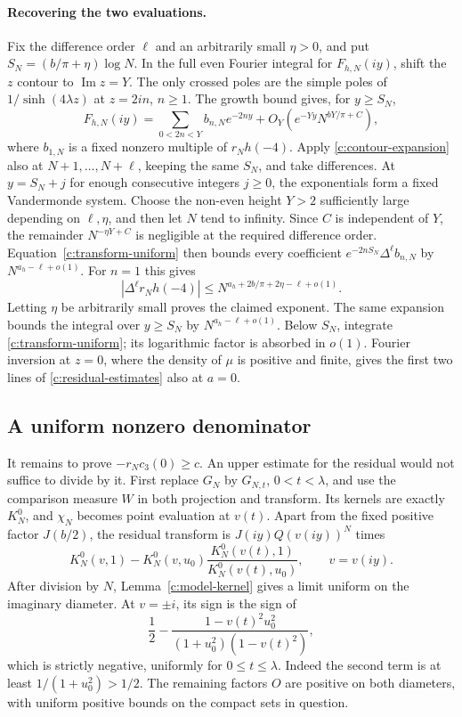 \documentclass[11pt]{article}
\numberwithin{equation}{section}
\theoremstyle{definition}\newtheorem{definition}[theorem]{Definition}
\theoremstyle{remark}\newtheorem{remark}[theorem]{Remark}
\begin{document}
\paragraph{Recovering the two evaluations.}
Fix the difference order $\ell$ and an arbitrarily small $\eta>0$, and
put $S_N=(b/\pi+\eta)\log N$.  In the full even Fourier integral for
$F_{h,N}(iy)$, shift the $z$ contour to $\operatorname{Im}z=Y$.
The only crossed poles are the simple poles of $1/\sinh(4\lambda z)$
at $z=2in$, $n\ge1$.  The growth bound gives, for $y\ge S_N$,
\begin{equation}\label{c:contour-expansion}
 F_{h,N}(iy)=\sum_{0<2n<Y}b_{n,N}e^{-2ny}
                  +O_Y(e^{-Yy}N^{bY/\pi+C}),
\end{equation}
where $b_{1,N}$ is a fixed nonzero multiple of $r_Nh(-4)$.
Apply \eqref{c:contour-expansion} also at $N+1,\ldots,N+\ell$,
keeping the same $S_N$, and take differences.  At
$y=S_N+j$ for enough consecutive integers $j\ge0$, the exponentials
form a fixed Vandermonde system.  Choose the non-even height $Y>2$
sufficiently large depending on $\ell,\eta$, and then let $N$ tend to
infinity.  Since $C$ is independent of $Y$, the remainder
$N^{-\eta Y+C}$ is negligible at the required difference order.
Equation~\eqref{c:transform-uniform} then bounds every coefficient
$e^{-2nS_N}\Delta^\ell b_{n,N}$ by
$N^{a_h-\ell+o(1)}$.  For $n=1$ this gives
\[
 |\Delta^\ell r_Nh(-4)|
 \le N^{a_h+2b/\pi+2\eta-\ell+o(1)}.
\]
Letting $\eta$ be arbitrarily small proves the claimed exponent.
The same expansion bounds the integral over $y\ge S_N$ by
$N^{a_h-\ell+o(1)}$.  Below $S_N$, integrate
\eqref{c:transform-uniform}; its logarithmic factor is absorbed in
$o(1)$.  Fourier inversion at $z=0$, where the density of $\mu$ is
positive and finite, gives the first two lines of
\eqref{c:residual-estimates} also at $a=0$.

\subsection{A uniform nonzero denominator}

It remains to prove $-r_Nc_3(0)\ge c$.  An upper estimate for the
residual would not suffice to divide by it.
First replace $G_N$ by $G_{N,t}$, $0<t<\lambda$, and use the
comparison measure $W$ in both projection and transform.  Its kernels
are exactly $K_N^0$, and $\chi_N$ becomes point evaluation at $v(t)$.
Apart from the fixed positive factor $J(b/2)$, the residual transform is
$J(iy)Q(v(iy))^N$ times
\[
 K_N^0(v,1)-K_N^0(v,u_0)
          \frac{K_N^0(v(t),1)}{K_N^0(v(t),u_0)},
 \qquad v=v(iy).
\]
After division by $N$, Lemma~\ref{c:model-kernel} gives a limit
uniform on the imaginary diameter.  At $v=\pm i$, its sign is the
sign of
\[
 \frac12-
 \frac{1-v(t)^2u_0^2}{(1+u_0^2)(1-v(t)^2)},
\]
which is strictly negative, uniformly for $0\le t\le\lambda$.
Indeed the second term is at least $1/(1+u_0^2)>1/2$.
The remaining factors $O$ are positive on both diameters, with uniform
positive bounds on the compact sets in question.
\end{document}
